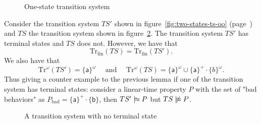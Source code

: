 \documentclass[./main]{subfiles}
\begin{document}
  \begin{figure}
    \centering
    \caption{One-state transition system}
    \label{fig:one-state-ts}
  \end{figure}

  \begin{exm}
    Consider the transition system $TS'$ shown in figure~\ref{fig:two-states-ts-oo} (page~\pageref{fig:two-states-ts-oo}) and $TS$ the transition system shown in figure~\ref{fig:two-states-ts-loop}.
    The transition system $TS'$ has terminal states and $TS$ does not. However, we have that
    \[
    \mathrm{Tr}_\mathrm{fin}(TS) = \mathrm{Tr}_\mathrm{fin}(TS')
    .\]
    We also have that \[
    \mathrm{Tr}^\omega(TS') = \{\mathsf{a}\}^\omega \quad \text{ and }\quad \mathrm{Tr}^\omega(TS) = \{\mathsf{a}\}^\omega \cup \{\mathsf{a}\}^+ \cdot \{b\}^\omega
    .\] 
    Thus giving a counter example to the previous lemma if one of the transition system has terminal states: consider a linear-time property $P$ with the set of "bad behaviors" as $P_\mathrm{bad} = \{\mathsf{a}\}^+ \cdot \{\mathsf{b}\}$, then $TS' \mathrel{{|}\!{\approx}} P$ but  $TS \nmd P$.
  \end{exm}

  \begin{figure}
    \centering
    \caption{A transition system with no terminal state}
    \label{fig:two-states-ts-loop}
  \end{figure}
\end{document}
